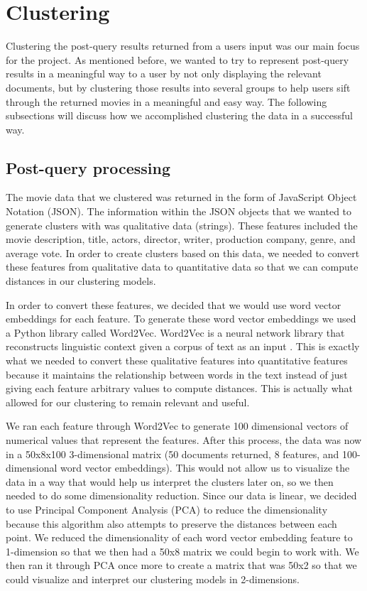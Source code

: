 \documentclass[sigconf]{acmart}
\begin{document}
\section{Clustering}
Clustering the post-query results returned from a users input was our main focus for the project. As mentioned before, we wanted to try to represent post-query results in a meaningful way to a user by not only displaying the relevant documents, but by clustering those results into several groups to help users sift through the returned movies in a meaningful and easy way. The following subsections will discuss how we accomplished clustering the data in a successful way.

\subsection{Post-query processing}
The movie data that we clustered was returned in the form of JavaScript Object Notation (JSON). The information within the JSON objects that we wanted to generate clusters with was qualitative data (strings). These features included the movie description, title, actors, director, writer, production company, genre, and average vote. In order to create clusters based on this data, we needed to convert these features from qualitative data to quantitative data so that we can compute distances in our clustering models.

In order to convert these features, we decided that we would use word vector embeddings for each feature. To generate these word vector embeddings we used a Python library called Word2Vec. Word2Vec is a neural network library that reconstructs linguistic context given a corpus of text as an input \cite{word2vec}. This is exactly what we needed to convert these qualitative features into quantitative features because it maintains the relationship between words in the text instead of just giving each feature arbitrary values to compute distances. This is actually what allowed for our clustering to remain relevant and useful.

We ran each feature through Word2Vec to generate 100 dimensional vectors of numerical values that represent the features. After this process, the data was now in a 50x8x100 3-dimensional matrix (50 documents returned, 8 features, and 100-dimensional word vector embeddings). This would not allow us to visualize the data in a way that would help us interpret the clusters later on, so we then needed to do some dimensionality reduction. Since our data is linear, we decided to use Principal Component Analysis (PCA) to reduce the dimensionality because this algorithm also attempts to preserve the distances between each point. We reduced the dimensionality of each word vector embedding feature to 1-dimension so that we then had a 50x8 matrix we could begin to work with. We then ran it through PCA once more to create a matrix that was 50x2 so that we could visualize and interpret our clustering models in 2-dimensions.
\end{document}
